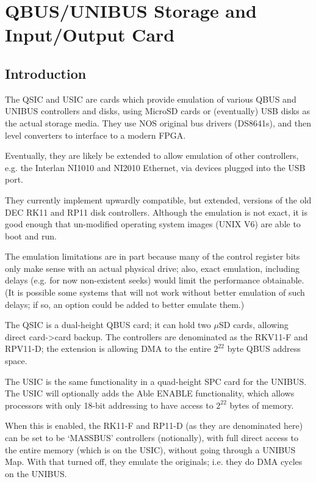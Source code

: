 %

\chapter{QBUS/UNIBUS Storage and Input/Output Card}
\section{Introduction}

The QSIC and USIC are cards which provide emulation of various QBUS and
UNIBUS controllers and disks, using MicroSD cards or (eventually) USB disks
as the actual storage media. They use NOS original bus drivers (DS8641s),
and then level converters to interface to a modern FPGA.

Eventually, they are likely be extended to allow emulation of other
controllers, e.g. the Interlan NI1010 and NI2010 Ethernet, via devices
plugged into the USB port.

They currently implement upwardly compatible, but extended, versions of the
old DEC RK11 and RP11 disk controllers. Although the emulation is not exact,
it is good enough that un-modified operating system images (UNIX V6) are able
to boot and run.

The emulation limitations are in part because many of the control register
bits only make sense with an actual physical drive; also, exact emulation,
including delays (e.g. for now non-existent seeks) would limit the
performance obtainable. (It is possible some systems that will not work
without better emulation of such delays; if so, an option could be added to
better emulate them.)

The QSIC is a dual-height QBUS card; it can hold two $\mu$SD cards,
allowing direct card-\textgreater card backup. The controllers are
denominated as the RKV11-F and RPV11-D; the extension is allowing DMA
to the entire $2^{22}$ byte QBUS address space.

The USIC is the same functionality in a quad-height SPC card for the UNIBUS.
The USIC will optionally adds the Able ENABLE functionality, which allows
processors with only 18-bit addressing to have access to $2^{22}$ bytes of
memory.

When this is enabled, the RK11-F and RP11-D (as they are denominated here)
can be set to be `MASSBUS' controllers (notionally), with full direct access
to the entire memory (which is on the USIC), without going through a UNIBUS
Map. With that turned off, they emulate the originals; i.e. they do DMA
cycles on the UNIBUS.

